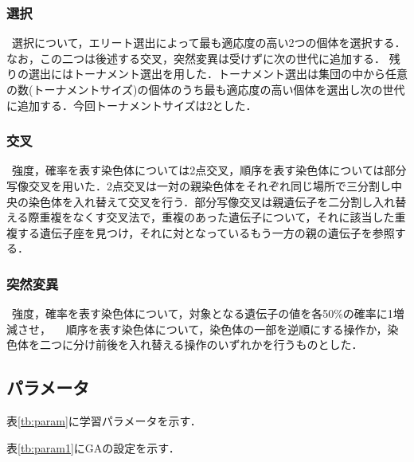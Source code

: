 \documentclass[twocolumn]{jarticle}     %
\begin{document}
\subsubsection{選択}
\ 選択について，エリート選出によって最も適応度の高い2つの個体を選択する．なお，この二つは後述する交叉，突然変異は受けずに次の世代に追加する．
残りの選出にはトーナメント選出を用した．トーナメント選出は集団の中から任意の数(トーナメントサイズ)の個体のうち最も適応度の高い個体を選出し次の世代に追加する．今回トーナメントサイズは2とした．
　
\subsubsection{交叉}
\ 強度，確率を表す染色体については2点交叉，順序を表す染色体については部分写像交叉を用いた．2点交叉は一対の親染色体をそれぞれ同じ場所で三分割し中央の染色体を入れ替えて交叉を行う．部分写像交叉は親遺伝子を二分割し入れ替える際重複をなくす交叉法で，重複のあった遺伝子について，それに該当した重複する遺伝子座を見つけ，それに対となっているもう一方の親の遺伝子を参照する．
　
\subsubsection{突然変異}
\ 強度，確率を表す染色体について，対象となる遺伝子の値を各50\%の確率に1増減させ，
　順序を表す染色体について，染色体の一部を逆順にする操作か，染色体を二つに分け前後を入れ替える操作のいずれかを行うものとした．
　
\subsection{パラメータ}
表\ref{tb:param}に学習パラメータを示す．
\begin{table}[h]
	\centering
	\caption{学習パラメータ\label{tb:param}}
\end{table}
 表\ref{tb:param1}にGAの設定を示す．
\begin{table}[h]
	\centering
	\caption{実験パラメータ\label{tb:param1}}
\end{table}
\end{document}
